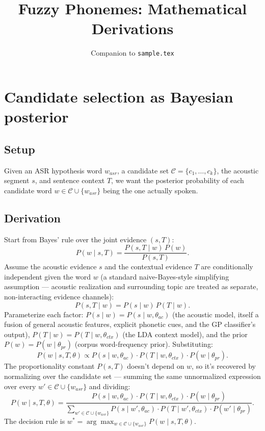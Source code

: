 \documentclass[11pt]{article}
\title{Fuzzy Phonemes: Mathematical Derivations}
\author{Companion to \texttt{sample.tex}}
\date{}
\begin{document}
\maketitle

\section{Candidate selection as Bayesian posterior}

\subsection{Setup}
Given an ASR hypothesis word $w_{asr}$, a candidate set
$\mathcal{C} = \{c_1, \ldots, c_k\}$, the acoustic segment $s$, and
sentence context $T$, we want the posterior probability of each
candidate word $w \in \mathcal{C} \cup \{w_{asr}\}$ being the one
actually spoken.

\subsection{Derivation}
Start from Bayes' rule over the joint evidence $(s, T)$:
\begin{equation}
P(w \mid s, T) = \frac{P(s, T \mid w) \, P(w)}{P(s, T)}.
\end{equation}
Assume the acoustic evidence $s$ and the contextual evidence $T$ are
conditionally independent given the word $w$ (a standard naive-Bayes-style
simplifying assumption --- acoustic realization and surrounding topic are
treated as separate, non-interacting evidence channels):
\begin{equation}
P(s, T \mid w) = P(s \mid w) \, P(T \mid w).
\end{equation}
Parameterize each factor: $P(s \mid w) = P(s \mid w, \theta_{ac})$ (the
acoustic model, itself a fusion of general acoustic features, explicit
phonetic cues, and the GP classifier's output), $P(T \mid w) = P(T \mid
w, \theta_{ctx})$ (the LDA context model), and the prior $P(w) = P(w \mid
\theta_{pr})$ (corpus word-frequency prior). Substituting:
\begin{equation}
P(w \mid s, T, \theta) \propto P(s \mid w, \theta_{ac}) \cdot
P(T \mid w, \theta_{ctx}) \cdot P(w \mid \theta_{pr}).
\end{equation}
The proportionality constant $P(s,T)$ doesn't depend on $w$, so it's
recovered by normalizing over the candidate set --- summing the same
unnormalized expression over every $w' \in \mathcal{C} \cup \{w_{asr}\}$
and dividing:
\begin{equation}
P(w \mid s, T, \theta) = \frac{P(s \mid w, \theta_{ac}) \cdot P(T \mid w, \theta_{ctx}) \cdot P(w \mid \theta_{pr})}
{\displaystyle\sum_{w' \in \mathcal{C} \cup \{w_{asr}\}} P(s \mid w', \theta_{ac}) \cdot P(T \mid w', \theta_{ctx}) \cdot P(w' \mid \theta_{pr})}.
\label{eq:posterior}
\end{equation}
The decision rule is $w^* = \arg\max_{w \in \mathcal{C}\cup\{w_{asr}\}} P(w \mid s, T, \theta)$.
\end{document}
